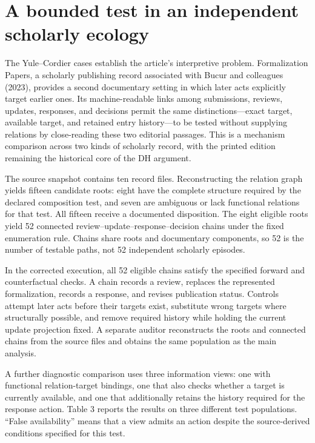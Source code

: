 \documentclass[11pt,a4paper]{article}
\begin{document}
\section{A bounded test in an independent scholarly ecology}

The Yule–Cordier cases establish the article's interpretive problem. Formalization Papers, a scholarly publishing record associated with Bucur and colleagues (2023), provides a second documentary setting in which later acts explicitly target earlier ones. Its machine-readable links among submissions, reviews, updates, responses, and decisions permit the same distinctions—exact target, available target, and retained entry history—to be tested without supplying relations by close-reading these two editorial passages. This is a mechanism comparison across two kinds of scholarly record, with the printed edition remaining the historical core of the DH argument.


The source snapshot contains ten record files. Reconstructing the relation graph yields fifteen candidate roots: eight have the complete structure required by the declared composition test, and seven are ambiguous or lack functional relations for that test. All fifteen receive a documented disposition. The eight eligible roots yield 52 connected review–update–response–decision chains under the fixed enumeration rule. Chains share roots and documentary components, so 52 is the number of testable paths, not 52 independent scholarly episodes.


In the corrected execution, all 52 eligible chains satisfy the specified forward and counterfactual checks. A chain records a review, replaces the represented formalization, records a response, and revises publication status. Controls attempt later acts before their targets exist, substitute wrong targets where structurally possible, and remove required history while holding the current update projection fixed. A separate auditor reconstructs the roots and connected chains from the source files and obtains the same population as the main analysis.


A further diagnostic comparison uses three information views: one with functional relation-target bindings, one that also checks whether a target is currently available, and one that additionally retains the history required for the response action. Table 3 reports the results on three different test populations. “False availability” means that a view admits an action despite the source-derived conditions specified for this test.
\end{document}
